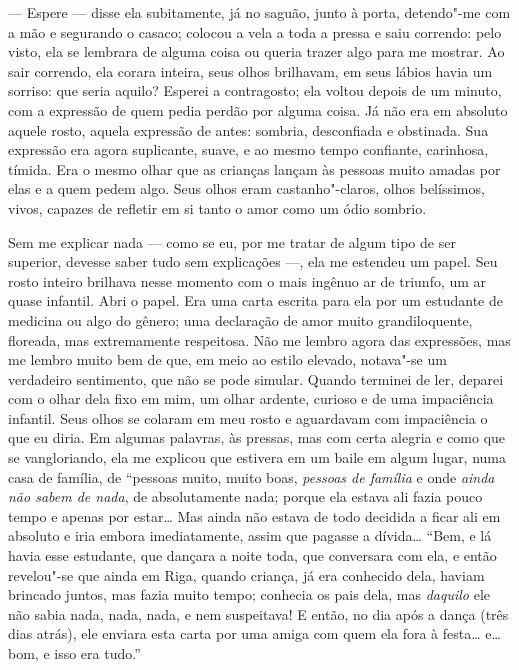--- Espere --- disse ela subitamente, já no saguão, junto à porta,
detendo"-me com a mão e segurando o casaco; colocou a vela a toda a
pressa e saiu correndo: pelo visto, ela se lembrara de alguma coisa ou
queria trazer algo para me mostrar. Ao sair correndo, ela corara
inteira, seus olhos brilhavam, em seus lábios havia um sorriso: que
seria aquilo? Esperei a contragosto; ela voltou depois de um minuto,
com a expressão de quem pedia perdão por alguma coisa. Já não era em
absoluto aquele rosto, aquela expressão de antes: sombria, desconfiada
e obstinada. Sua expressão era agora suplicante, suave, e ao mesmo
tempo confiante, carinhosa, tímida. Era o mesmo olhar que as crianças
lançam às pessoas muito amadas por elas e a quem pedem algo. Seus olhos
eram castanho"-claros, olhos belíssimos, vivos, capazes de refletir em
si tanto o amor como um ódio sombrio.

Sem me explicar nada --- como se eu, por me tratar de algum tipo de ser
superior, devesse saber tudo sem explicações ---, ela me estendeu um papel. Seu
rosto inteiro brilhava nesse momento com o mais ingênuo ar de triunfo, um ar
quase infantil. Abri o papel. Era uma carta escrita para ela por um estudante
de medicina ou algo do gênero; uma declaração de amor muito grandiloquente,
floreada, mas extremamente respeitosa.  Não me lembro agora das expressões, mas
me lembro muito bem de que, em meio ao estilo elevado, notava"-se um verdadeiro
sentimento, que não se pode simular. Quando terminei de ler, deparei com o
olhar dela fixo em mim, um olhar ardente, curioso e de uma impaciência
infantil. Seus olhos se colaram em meu rosto e aguardavam com impaciência o que
eu diria. Em algumas palavras, às pressas, mas com certa alegria e como que se
vangloriando, ela me explicou que estivera em um baile em algum lugar, numa
casa de família, de ``pessoas muito, muito boas, \textit{pessoas de família} e
onde \textit{ainda não sabem de nada}, de absolutamente nada; porque ela
estava ali fazia pouco tempo e apenas por estar\ldots{} Mas ainda não estava de
todo decidida a ficar ali em absoluto e iria embora imediatamente, assim que
pagasse a dívida\ldots{} ``Bem, e lá havia esse estudante, que dançara a noite
toda, que conversara com ela, e então revelou"-se que ainda em Riga, quando
criança, já era conhecido dela, haviam brincado juntos, mas fazia muito tempo;
conhecia os pais dela, mas \textit{daquilo} ele não sabia nada, nada, nada, e
nem suspeitava! E então, no dia após a dança (três dias atrás), ele enviara
esta carta por uma amiga com quem ela fora à festa\ldots{} e\ldots{} bom, e
isso era tudo.''

